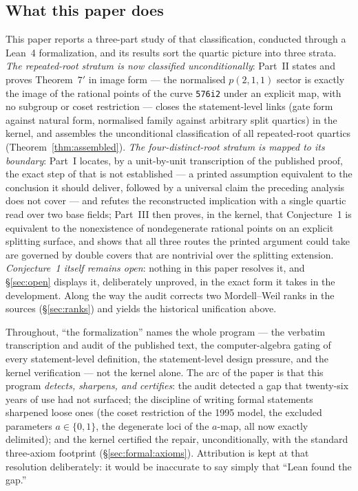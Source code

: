 \documentclass[11pt]{amsart}
\begin{document}
\subsection{What this paper does}\label{sec:intro:parts}

This paper reports a three-part study of that classification, conducted
through a Lean~4 \cite{Lean} formalization, and its results sort the quartic
picture into three strata.  \emph{The repeated-root stratum is now
classified unconditionally}: Part~II states and proves Theorem~$7'$ in
image form --- the normalised $p(2,1,1)$ sector is exactly the image of
the rational points of the curve \texttt{576i2} under an explicit map,
with no subgroup or coset restriction --- closes the statement-level
links (gate form against natural form, normalised family against
arbitrary split quartics) in the kernel, and assembles the
unconditional classification of all repeated-root quartics
(Theorem~\ref{thm:assembled}).  \emph{The four-distinct-root stratum is mapped to its
boundary}: Part~I locates, by a unit-by-unit transcription of the
published proof, the exact step of \cite{BM2000} that is not
established --- a printed assumption equivalent to the conclusion it
should deliver, followed by a universal claim the preceding analysis
does not cover --- and refutes the reconstructed implication with a
single quartic read over two base fields; Part~III then proves, in the
kernel, that Conjecture~1 is equivalent to the nonexistence of
nondegenerate rational points on an explicit splitting surface, and
shows that all three routes the printed argument could take are
governed by double covers that are nontrivial over the splitting
extension.  \emph{Conjecture~1 itself remains open}: nothing in this
paper resolves it, and \S\ref{sec:open} displays it, deliberately
unproved, in the exact form it takes in the development.  Along the
way the audit corrects two Mordell--Weil ranks in the sources
(\S\ref{sec:ranks}) and yields the historical unification above.

Throughout, ``the formalization'' names the whole program --- the
verbatim transcription and audit of the published text, the
computer-algebra gating of every statement-level definition, the statement-level
design pressure, and the kernel verification --- not the kernel alone.
The arc of the paper is that this program \emph{detects, sharpens, and
certifies}: the audit detected a gap that twenty-six years of use had
not surfaced; the discipline of writing formal statements sharpened
loose ones (the coset restriction of the 1995 model, the excluded
parameters $a\in\{0,1\}$, the degenerate loci of the $a$-map, all now
exactly delimited); and the kernel certified the repair,
unconditionally, with the standard three-axiom footprint
(\S\ref{sec:formal:axioms}).  Attribution is kept
at that resolution deliberately: it would be inaccurate to say simply
that ``Lean found the gap.''
\end{document}
